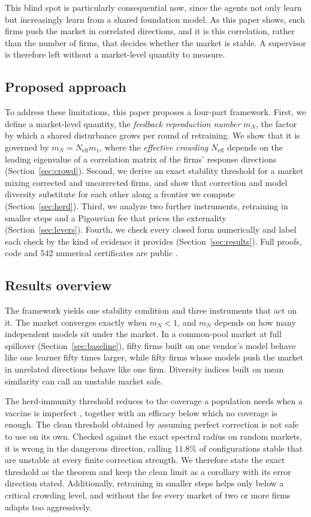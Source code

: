 \documentclass[conference]{IEEEtran}
\theoremstyle{definition}
\newcommand{\Neff}{N_{\mathrm{eff}}}
\begin{document}
This blind spot is particularly consequential now, since the agents not only
learn but increasingly learn from a shared foundation model. As this paper
shows, such firms push the market in correlated directions, and it is this
correlation, rather than the number of firms, that decides whether the market
is stable. A supervisor is therefore left without a market-level quantity to
measure.

\subsection{Proposed approach}
To address these limitations, this paper proposes a four-part framework.
First, we define a market-level quantity, the \emph{feedback reproduction
number} $m_N$, the factor by which a shared disturbance grows per round of
retraining. We show that it is governed by $m_N = \Neff m_1$, where the
\emph{effective crowding} $\Neff$ depends on the leading eigenvalue of a
correlation matrix of the firms' response directions (Section~\ref{sec:crowd}).
Second, we derive an exact stability threshold for a market mixing corrected
and uncorrected firms, and show that correction and model diversity substitute
for each other along a frontier we compute (Section~\ref{sec:herd}). Third, we
analyze two further instruments, retraining in smaller steps and a Pigouvian
fee that prices the externality (Section~\ref{sec:levers}). Fourth, we check
every closed form numerically and label each check by the kind of evidence it
provides (Section~\ref{sec:results}). Full proofs, code and 542 numerical
certificates are public \cite{price2026}.

\subsection{Results overview}
The framework yields one stability condition and three instruments that act on
it. The market converges exactly when $m_N < 1$, and $m_N$ depends on how many
independent models sit under the market. In a common-pool market at full
spillover (Section~\ref{sec:baseline}), fifty firms built on one vendor's
model behave like one learner fifty times larger, while fifty firms whose
models push the market in unrelated directions behave like one firm. Diversity
indices built on mean similarity can call an unstable market safe.

The herd-immunity threshold reduces to the coverage a population needs when a
vaccine is imperfect \cite{anderson1985,fine2011}, together with an efficacy
below which no coverage is enough. The clean threshold obtained by assuming
perfect correction is not safe to use on its own. Checked against the exact
spectral radius on random markets, it is wrong in the dangerous direction,
calling $11.8\%$ of configurations stable that are unstable at every finite
correction strength. We therefore state the exact threshold as the theorem and
keep the clean limit as a corollary with its error direction stated.
Additionally, retraining in smaller steps helps only below a critical crowding
level, and without the fee every market of two or more firms adapts too
aggressively.
\end{document}
